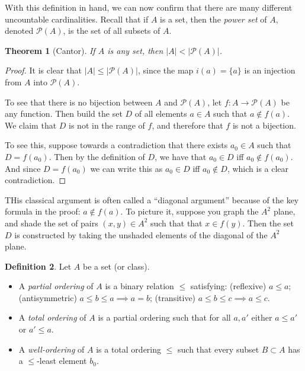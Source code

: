 \documentclass[11pt,oneside,a4paper]{amsbook}
\theoremstyle{definition}
\theoremstyle{plain}
\newtheorem{theorem}{Theorem}[section]
\theoremstyle{definition}
\newtheorem{definition}[theorem]{Definition}
\theoremstyle{remark}
\numberwithin{equation}{section}
\numberwithin{figure}{section}
\begin{document}
With this definition in hand, we can now confirm that there are many different uncountable cardinalities. Recall that if $A$ is a set, then the \emph{power set} of $A$, denoted $\mathcal P(A)$, is the set of all subsets of $A$.

\begin{theorem}[Cantor]
  If $A$ is any set, then $|A|<|\mathcal P(A)|$.
\end{theorem}

\begin{proof}
  It is clear that $|A|\leq|\mathcal P(A)|$, since the map $i(a)=\{a\}$ is an injection from $A$ into $\mathcal P(A)$.

  To see that there is no bijection between $A$ and $\mathcal P(A)$, let $f\colon A\to\mathcal P(A)$ be any function. Then build the set $D$ of all elements $a\in A$ such that $a\notin f(a)$. We claim that $D$ is not in the range of $f$, and therefore that $f$ is not a bijection.

  To see this, suppose towards a contradiction that there exists $a_0\in A$ such that $D=f(a_0)$. Then by the definition of $D$, we have that $a_0\in D$ iff $a_0\notin f(a_0)$. And since $D=f(a_0)$ we can write this as $a_0\in D$ iff $a_0\notin D$, which is a clear contradiction.
\end{proof}

THis classical argument is often called a ``diagonal argument'' because of the key formula in the proof: $a\notin f(a)$. To picture it, suppose you graph the $A^2$ plane, and shade the set of pairs $(x,y)\in A^2$ such that that $x\in f(y)$. Then the set $D$ is constructed by taking the unshaded elements of the diagonal of the $A^2$ plane.

\begin{definition}
  Let $A$ be a set (or class).
  \begin{itemize}
    \item A \emph{partial ordering} of $A$ is a binary relation $\leq$ satisfying: (reflexive) $a\leq a$; (antisymmetric) $a\leq b\leq a\implies a=b$; (transitive) $a\leq b\leq c\implies a\leq c$.
    \item A \emph{total ordering} of $A$ is a partial ordering such that for all $a,a'$ either $a\leq a'$ or $a'\leq a$.
    \item A \emph{well-ordering} of $A$ is a total ordering $\leq$ such that every subset $B\subset A$ has a $\leq$-least element $b_0$.
  \end{itemize}
\end{definition}
\end{document}
